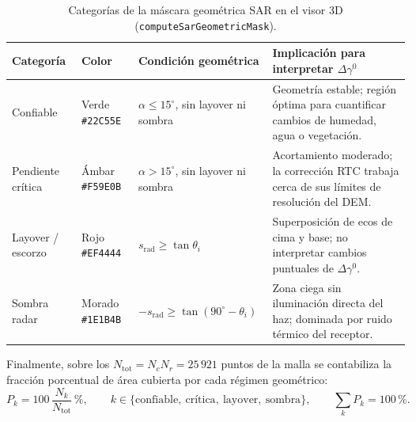 \documentclass[11pt,a4paper]{article}
\begin{document}
\begin{table}[htbp]
\centering\small
\begin{tabularx}{\linewidth}{p{.23\linewidth}p{.16\linewidth}p{.24\linewidth}X}
\toprule
\textbf{Categoría} & \textbf{Color} & \textbf{Condición geométrica} & \textbf{Implicación para interpretar $\Delta\gamma^0$}\\\midrule
Confiable & Verde \texttt{\#22C55E} & $\alpha \le 15^\circ$, sin layover ni sombra & Geometría estable; región óptima para cuantificar cambios de humedad, agua o vegetación.\\
Pendiente crítica & Ámbar \texttt{\#F59E0B} & $\alpha > 15^\circ$, sin layover ni sombra & Acortamiento moderado; la corrección RTC trabaja cerca de sus límites de resolución del DEM.\\
Layover / escorzo & Rojo \texttt{\#EF4444} & $s_{\mathrm{rad}} \ge \tan\theta_i$ & Superposición de ecos de cima y base; no interpretar cambios puntuales de $\Delta\gamma^0$.\\
Sombra radar & Morado \texttt{\#1E1B4B} & $-s_{\mathrm{rad}} \ge \tan(90^\circ-\theta_i)$ & Zona ciega sin iluminación directa del haz; dominada por ruido térmico del receptor.\\\bottomrule
\end{tabularx}
\caption{Categorías de la máscara geométrica SAR en el visor 3D (\texttt{computeSarGeometricMask}).}
\label{tab:clases-mascara-sar}
\end{table}

Finalmente, sobre los $N_{\mathrm{tot}} = N_c N_r = 25\,921$ puntos de la malla se contabiliza la fracción
porcentual de área cubierta por cada régimen geométrico:
\begin{equation}
  P_k = 100\,\frac{N_k}{N_{\mathrm{tot}}}\,\mathrm{\%},
  \qquad
  k \in \{\text{confiable},\ \text{crítica},\ \text{layover},\ \text{sombra}\},
  \qquad
  \sum_k P_k = 100\,\mathrm{\%}.
  \label{eq:porcentajes-sar}
\end{equation}
\end{document}
